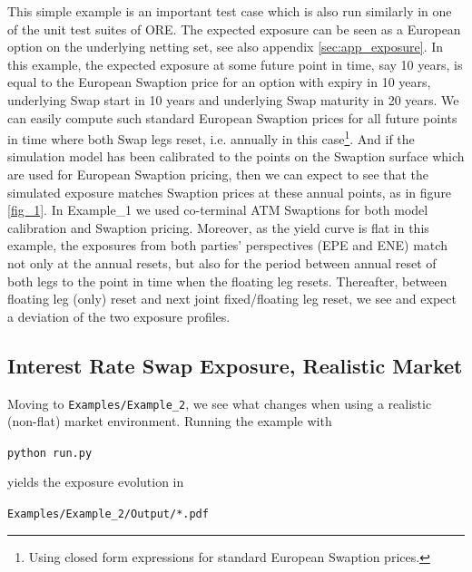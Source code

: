 \documentclass[12pt, a4paper]{article}
\begin{document}
{This simple example is an important test case which is also run similarly in one of the unit test suites of ORE. The
expected exposure can be seen as a European option on the underlying netting set, see also appendix
\ref{sec:app_exposure}. In this example, the expected exposure at some future point in time, say 10 years, is equal to
the European Swaption price for an option with expiry in 10 years, underlying Swap start in 10 years and underlying Swap
maturity in 20 years. We can easily compute such standard European Swaption prices for all future points in time where
both Swap legs reset, i.e. annually in this case\footnote{Using closed form expressions for standard European Swaption
  prices.}. And if the simulation model has been calibrated to the points on the Swaption surface which are used for
European Swaption pricing, then we can expect to see that the simulated exposure matches Swaption prices at these annual
points, as in figure \ref{fig_1}.  In Example\_1 we used co-terminal ATM Swaptions for both model calibration and
Swaption pricing. Moreover, as the yield curve is flat in this example, the exposures from both parties'
perspectives (EPE and ENE) match not only at the annual resets, but also for the period between annual reset of both
legs to the point in time when the floating leg resets. Thereafter, between floating leg (only) reset and next joint
fixed/floating leg reset, we see and expect a deviation of the two exposure profiles.

\subsection{Interest Rate Swap Exposure, Realistic Market}\label{sec:example2}

Moving to {\tt Examples/Example\_2}, we see what changes when using a realistic (non-flat) market
environment. Running the example with

\medskip
\centerline{\tt python run.py } 
\medskip

yields the exposure evolution in 

\medskip
\centerline{\tt Examples/Example\_2/Output/*.pdf } 
\medskip

}
\end{document}

